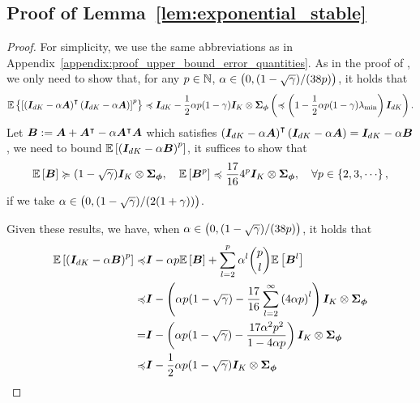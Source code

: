 \subsection{Proof of Lemma~\ref{lem:exponential_stable}}\label{appendix:proof_exponential_stable}
\begin{proof}
For simplicity, we use the same abbreviations as in Appendix~\ref{appendix:proof_upper_bound_error_quantities}.
As in the proof of \citep[Lemma~2][]{samsonov2024improved}, we only need to show that, for any $p\in{\mathbb N}$, $\alpha\in\left({0,(1-\sqrt\gamma)/(38p)}\right)$, it holds that
\begin{equation*}
    {\mathbb E}\left\{{\left[{\left({{\bm{I}}_{dK}-\alpha{\bm{A}}}\right)^{\intercal}\left({{\bm{I}}_{dK}-\alpha{\bm{A}}}\right)}\right]^p}\right\}\preccurlyeq {\bm{I}}_{dK}-\frac{1}{2}\alpha p(1-\gamma){\bm{I}}_K\otimes{\bm{\Sigma}}_{{\bm{\phi}}}\left({\preccurlyeq \left({1-\frac{1}{2}\alpha p (1-\gamma)\lambda_{\min}}\right){\bm{I}}_{dK}}\right).
\end{equation*}
Let ${\bm{B}}:={\bm{A}}+{\bm{A}}^{\intercal}-\alpha {\bm{A}}^{\intercal}{\bm{A}}$ which satisfies $\left({{\bm{I}}_{dK}-\alpha{\bm{A}}}\right)^{\intercal}\left({{\bm{I}}_{dK}-\alpha{\bm{A}}}\right)={\bm{I}}_{dK}-\alpha{\bm{B}}$, we need to bound ${\mathbb E}\left[{\left({{\bm{I}}_{dK}-\alpha{\bm{B}}}\right)^p}\right]$, it suffices to show that
\begin{equation*}
   {\mathbb E}\left[{{\bm{B}}}\right]\succcurlyeq (1-\sqrt\gamma){\bm{I}}_K\otimes{\bm{\Sigma}}_{{\bm{\phi}}},\quad  {\mathbb E}\left[{{\bm{B}}^p}\right]\preccurlyeq \frac{17}{16}4^p{\bm{I}}_K\otimes{\bm{\Sigma}}_{{\bm{\phi}}} ,\quad \forall p\in\left\{{2,3,\cdots}\right\},
\end{equation*}
if we take $\alpha\in\left({0,(1-\sqrt\gamma)/(2(1+\gamma))}\right)$. 

Given these results, we have, when $\alpha\in\left({0,(1-\sqrt\gamma)/(38p)}\right)$, it holds that
\begin{equation*}
\begin{aligned}
        {\mathbb E}\left[{\left({{\bm{I}}_{dK}-\alpha{\bm{B}}}\right)^p}\right]\preccurlyeq&{\bm{I}}-\alpha p {\mathbb E}\left[{{\bm{B}}}\right]+\sum_{l=2}^p\alpha^l \binom{p}{l}{\mathbb E}\left[{{\bm{B}}^l}\right]\\
        \preccurlyeq&{\bm{I}}-\left({\alpha p (1-\sqrt\gamma)-\frac{17}{16}\sum_{l=2}^\infty\left({4\alpha p}\right)^l }\right){\bm{I}}_K\otimes{\bm{\Sigma}}_{{\bm{\phi}}}\\
        =&{\bm{I}}-\left({\alpha p (1-\sqrt\gamma)-\frac{17\alpha^2p^2}{1-4\alpha p }}\right){\bm{I}}_K\otimes{\bm{\Sigma}}_{{\bm{\phi}}}\\
        \preccurlyeq&{\bm{I}}-\frac{1}{2}\alpha p(1-\sqrt\gamma){\bm{I}}_K\otimes{\bm{\Sigma}}_{{\bm{\phi}}}
\end{aligned}
\end{equation*}


\end{proof}
